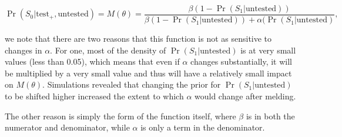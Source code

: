 \documentclass[12pt,twoside]{smiththesis}
\begin{document}
\[\Pr(S_0|\text{test}_+, \text{untested}) = M(\theta)  = \dfrac{\beta (1- \Pr(S_1|\text{untested}))}{\beta(1- \Pr(S_1|\text{untested})) + \alpha(\Pr(S_1|\text{untested})},\]

we note that there are two reasons that this function is not as sensitive to changes in \(\alpha\). For one, most of the density of \(\Pr(S_1|\text{untested})\) is at very small values (less than 0.05), which means that even if \(\alpha\) changes substantially, it will be multiplied by a very small value and thus will have a relatively small impact on \(M(\theta)\). Simulations revealed that changing the prior for \(\Pr(S_1|\text{untested})\) to be shifted higher increased the extent to which \(\alpha\) would change after melding.

The other reason is simply the form of the function itself, where \(\beta\) is in both the numerator and denominator, while \(\alpha\) is only a term in the denominator.
\end{document}
